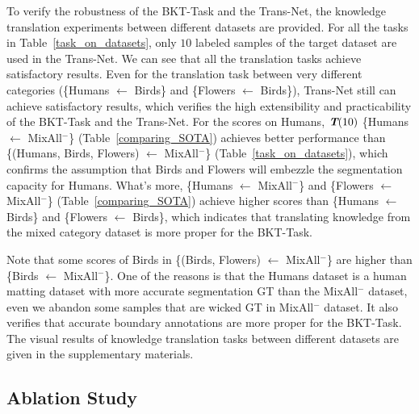 \documentclass[letterpaper]{article} %
\begin{document}
To verify the robustness of the BKT-Task and the Trans-Net, the knowledge translation experiments between different datasets are provided. For all the tasks in Table~\ref{task_on_datasets}, only $10$ labeled samples of the target dataset are used in the Trans-Net.
We can see that all the translation tasks achieve satisfactory results.
Even for the translation task between very different categories (\{Humans $\leftarrow$ Birds\} and \{Flowers $\leftarrow$ Birds\}), Trans-Net still can achieve satisfactory results, which verifies the high extensibility and practicability of the BKT-Task and the Trans-Net.
For the scores on Humans, $\textbf{\em T}(10)$ \{Humans $\leftarrow$ MixAll$^{-}$\} (Table~\ref{comparing_SOTA}) achieves better performance than \{(Humans, Birds, Flowers) $\leftarrow$ MixAll$^{-}$\} (Table~\ref{task_on_datasets}),
which confirms the assumption that Birds and Flowers will embezzle the segmentation capacity for Humans.
What's more, \{Humans $\leftarrow$ MixAll$^{-}$\} and \{Flowers $\leftarrow$ MixAll$^{-}$\} (Table~\ref{comparing_SOTA}) achieve higher scores than \{Humans $\leftarrow$ Birds\} and \{Flowers $\leftarrow$ Birds\}, which indicates that translating knowledge from the mixed category dataset is more proper for the BKT-Task.

Note that some scores of Birds in \{(Birds, Flowers) $\leftarrow$ MixAll$^{-}$\} are higher than
\{Birds $\leftarrow$ MixAll$^{-}$\}. One of the reasons is that the Humans dataset is a human matting dataset with more accurate segmentation GT than the MixAll$^{-}$ dataset, even we abandon some samples that are wicked GT in MixAll$^{-}$ dataset.
It also verifies that accurate boundary annotations are more proper for the BKT-Task.
The visual results of knowledge translation tasks between different datasets are given in the supplementary materials.


\subsection{Ablation Study}
\end{document}
